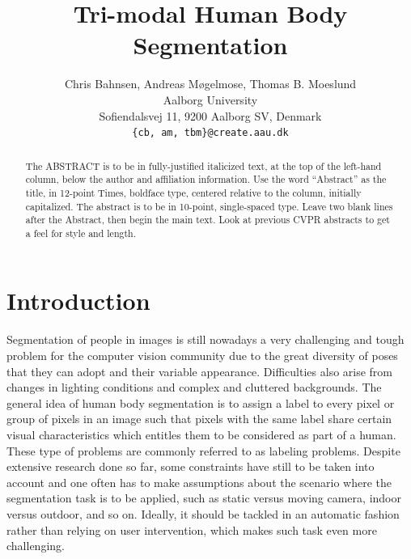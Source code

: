 \documentclass[10pt,twocolumn,letterpaper]{article}
\begin{document}
\title{Tri-modal Human Body Segmentation}

\author{Chris Bahnsen, Andreas Møgelmose, Thomas B. Moeslund\\
Aalborg University\\
Sofiendalsvej 11, 9200 Aalborg SV, Denmark\\
{\tt\small \{cb, am, tbm\}@create.aau.dk}
}

\maketitle

\begin{abstract}
   The ABSTRACT is to be in fully-justified italicized text, at the top
   of the left-hand column, below the author and affiliation
   information. Use the word ``Abstract'' as the title, in 12-point
   Times, boldface type, centered relative to the column, initially
   capitalized. The abstract is to be in 10-point, single-spaced type.
   Leave two blank lines after the Abstract, then begin the main text.
   Look at previous CVPR abstracts to get a feel for style and length.
\end{abstract}

\section{Introduction}
\label{sec:introduction}

Segmentation of people in images is still nowadays a very challenging and tough problem for the computer vision community due to the great diversity of poses that they can adopt and their variable appearance. Difficulties also arise from changes in lighting conditions and complex and cluttered backgrounds. The general idea of human body segmentation is to assign a label to every pixel or group of pixels in an image such that pixels with the same label share certain visual characteristics which entitles them to be considered as part of a human. These type of problems are commonly referred to as labeling problems. Despite extensive research done so far, some constraints have still to be taken into account and one often has to make assumptions about the scenario where the segmentation task is to be applied, such as static versus moving camera, indoor versus outdoor, and so on. Ideally, it should be tackled in an automatic fashion rather than relying on user intervention, which makes such task even more challenging. 
\end{document}
